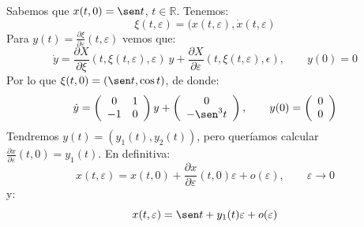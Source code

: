 \begin{ejemplo}
\begin{itemize}
            \noindent
            Sabemos que $x(t,0) = \sen t$, $t\in \mathbb{R}$. Tenemos:
            \begin{equation*}
                \xi(t,\varepsilon) = (x(t,\varepsilon),\dot{x}(t,\varepsilon)
            \end{equation*}
            Para $y(t) = \frac{\partial \xi}{\partial \varepsilon}(t,\varepsilon)$ vemos que:
            \begin{equation*}
                \dot{y} = \frac{\partial X}{\partial \xi}(t,\xi(t,\varepsilon),\varepsilon)\ y + \frac{\partial X}{\partial \varepsilon}(t,\xi(t,\varepsilon),\epsilon), \qquad y(0) = 0
            \end{equation*}
            Por lo que $\xi(t,0) = (\sen t, \cos t)$, de donde:
            \begin{equation*}
                \dot{y} = \left(\begin{array}{cc}
                    0 & 1 \\
                    -1 & 0 
                \end{array}\right)y + \left(\begin{array}{cc}
                    0 \\
                    -\sen^3 t 
                \end{array}\right), \qquad y(0) = \left(\begin{array}{c}
                    0  \\
                    0  
                \end{array}\right)
            \end{equation*}
            Tendremos $y(t) = (y_1(t), y_2(t))$, pero queríamos calcular $\frac{\partial x}{\partial \varepsilon}(t,0) = y_1(t)$. En definitiva:
            \begin{equation*}
                x(t,\varepsilon) = x(t,0) + \frac{\partial x}{\partial \varepsilon}(t,0)\varepsilon + o(\varepsilon), \qquad \varepsilon\to 0
            \end{equation*}
            y:
            \begin{equation*}
                x(t,\varepsilon) = \sen t + y_1(t) \varepsilon + o(\varepsilon)
            \end{equation*}
    \end{itemize}
\end{ejemplo}

